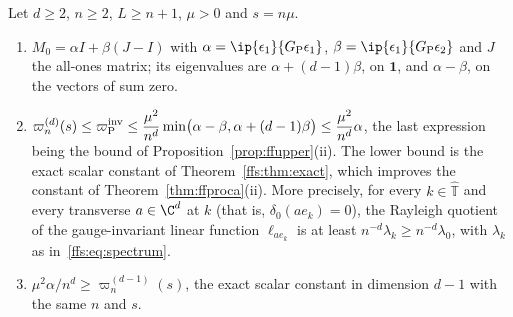 \begin{proposition}\label{ffs:prop:proca}
Let $d\ge2$, $n\ge2$, $L\ge n+1$, $\mu>0$ and $s=n\mu$.
\begin{enumerate}[label=\textup{(\roman*)},leftmargin=*]
\item $M_0=\alpha I+\beta(J-I)$ with $\alpha=\ip{\epsilon_1}{G_{\rm P}\epsilon_1
}$, $\beta=\ip{\epsilon_1}{G_{\rm P}\epsilon_2}$ and $J$ the all-ones matrix;
its eigenvalues are $\alpha+(d-1)\beta$, on $\mathbf 1$, and $\alpha-\beta$, on
the vectors of sum zero.
\item $\displaystyle\varpi_n^{(d)}(s)\le\varpi_{\rm P}^{\rm inv}\le\frac{\mu^2}
{n^d}\min\bigl(\alpha-\beta,\alpha+(d-1)\beta\bigr)\le\frac{\mu^2}{n^d}\alpha$,
the last expression being the bound of Proposition~\textup{\ref{prop:ffupper}(ii)}.
The lower bound is the exact scalar constant of Theorem~\ref{ffs:thm:exact},
which improves the constant of Theorem~\ref{thm:ffproca}(ii). More precisely,
for every $k\in\widehat{\mathbb T}$ and every transverse $a\in\C^d$ at $k$
(that is, $\delta_0(ae_k)=0$), the Rayleigh quotient of the gauge-invariant
linear function $\ell_{ae_k}$ is at least $n^{-d}\lambda_k\ge n^{-d}\lambda_0$,
with $\lambda_k$ as in~\eqref{ffs:eq:spectrum}.
\item $\mu^2\alpha/n^d\ge\varpi_n^{(d-1)}(s)$, the exact scalar constant in
dimension $d-1$ with the same $n$ and $s$.
\end{enumerate}
\end{proposition}

